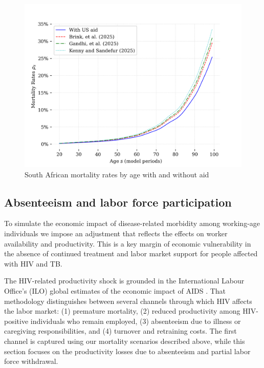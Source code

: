 \documentclass[letterpaper,12pt]{article}
\theoremstyle{definition}
\begin{document}
\begin{spacing}{1.5}
\begin{figure}[H]
    \caption{South African mortality rates by age with and without aid}
    \label{fig:Mortality}
    \centering
    \includegraphics[scale=0.75]{./tables_figures/mortality_rates.png}
\end{figure}





\subsection{Absenteeism and labor force participation}

To simulate the economic impact of disease-related morbidity among working-age individuals we impose an adjustment that reflects the effects on worker availability and productivity. This is a key margin of economic vulnerability in the absence of continued treatment and labor market support for people affected with HIV and TB.

The HIV-related productivity shock is grounded in the International Labour Office's (ILO) global estimates of the economic impact of AIDS \citep{ILO2018}. That methodology distinguishes between several channels through which HIV affects the labor market: (1) premature mortality, (2) reduced productivity among HIV-positive individuals who remain employed, (3) absenteeism due to illness or caregiving responsibilities, and (4) turnover and retraining costs. The first channel is captured using our mortality scenarios described above, while this section focuses on the productivity losses due to absenteeism and partial labor force withdrawal.


\end{spacing}
\end{document}
